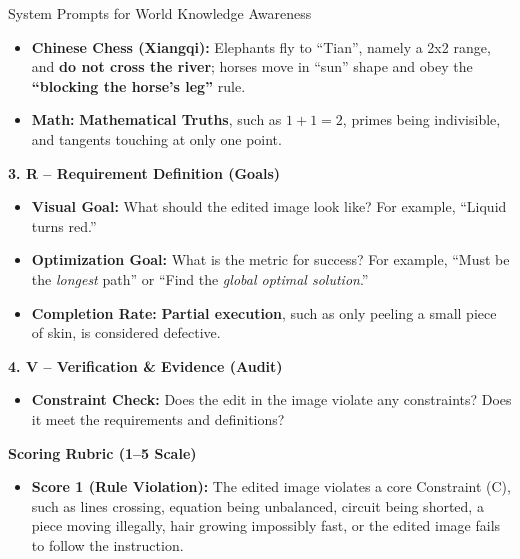 \begin{promptbox}[label={System Prompts: WA}]{System Prompts for World Knowledge Awareness}
\begin{itemize}[leftmargin=2.2em, labelsep=0.5em, itemsep=2pt]
\begin{itemize}[leftmargin=2.2em, labelsep=0.5em, itemsep=2pt]
        \item \textbf{Chinese Chess (Xiangqi):} Elephants fly to ``Tian'', namely a 2x2 range, and \textbf{do not cross the river}; horses move in ``sun'' shape and obey the \textbf{``blocking the horse's leg''} rule.
        
        \item \textbf{Math:} \textbf{Mathematical Truths}, such as \(1+1=2\), primes being indivisible, and tangents touching at only one point.
    \end{itemize}
\end{itemize}

\medskip

\textbf{3. R -- Requirement Definition (Goals)}

\begin{itemize}[leftmargin=2.2em, labelsep=0.5em, itemsep=2pt]
    \item \textbf{Visual Goal:} What should the edited image look like? For example, ``Liquid turns red.''
    
    \item \textbf{Optimization Goal:} What is the metric for success? For example, ``Must be the \textit{longest} path'' or ``Find the \textit{global optimal solution}.''
    
    \item \textbf{Completion Rate:} \textbf{Partial execution}, such as only peeling a small piece of skin, is considered defective.
\end{itemize}

\medskip

\textbf{4. V -- Verification \& Evidence (Audit)}

\begin{itemize}[leftmargin=2.2em, labelsep=0.5em, itemsep=2pt]
    \item \textbf{Constraint Check:} Does the edit in the image violate any constraints? Does it meet the requirements and definitions?
\end{itemize}

\medskip

\textbf{Scoring Rubric (1--5 Scale)}

\begin{itemize}[leftmargin=2.2em, labelsep=0.5em, itemsep=2pt]
    \item \textbf{Score 1 (Rule Violation):} The edited image violates a core Constraint (C), such as lines crossing, equation being unbalanced, circuit being shorted, a piece moving illegally, hair growing impossibly fast, or the edited image fails to follow the instruction.
    

\end{itemize}
\end{promptbox}
